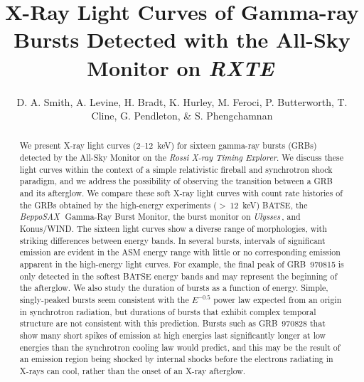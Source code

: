 \documentclass{aastex}
\def\sax{{\it BeppoSAX\,}}
\def\rxte{{\it RXTE\,}}
\def\uly{{\it Ulysses\,}}
\begin{document}
 
\title{X-Ray Light Curves of Gamma-ray Bursts Detected with the All-Sky
Monitor on \rxte}

\author{D. A. Smith, A. Levine, H. Bradt, K. Hurley, M. Feroci, P. Butterworth, T. Cline, G. Pendleton, \& S. Phengchamnan}



\begin{abstract}

We present X-ray light curves (2--12~keV) for sixteen gamma-ray bursts
(GRBs) detected by the All-Sky Monitor on the {\it Rossi X-ray Timing
Explorer}.  We discuss these light curves within the context of a
simple relativistic fireball and synchrotron shock paradigm, and we
address the possibility of observing the transition between a GRB and
its afterglow.  We compare these soft X-ray light curves with count
rate histories of the GRBs obtained by the high-energy experiments
($>~12$~keV) BATSE, the \sax~Gamma-Ray Burst Monitor, the burst
monitor on \uly, and Konus/WIND.  The sixteen light curves show a
diverse range of morphologies, with striking differences between
energy bands.  In several bursts, intervals of significant emission
are evident in the ASM energy range with little or no corresponding
emission apparent in the high-energy light curves.  For example, the
final peak of GRB~970815 is only detected in the softest BATSE energy
bands and may represent the beginning of the afterglow.  We also study
the duration of bursts as a function of energy.  Simple, singly-peaked
bursts seem consistent with the $E^{-0.5}$ power law expected from an
origin in synchrotron radiation, but durations of bursts that exhibit
complex temporal structure are not consistent with this prediction.
Bursts such as GRB~970828 that show many short spikes of emission at
high energies last significantly longer at low energies than the
synchrotron cooling law would predict, and this may be the result of
an emission region being shocked by internal shocks before the
electrons radiating in X-rays can cool, rather than the onset of an
X-ray afterglow.

\end{abstract}
\end{document}
